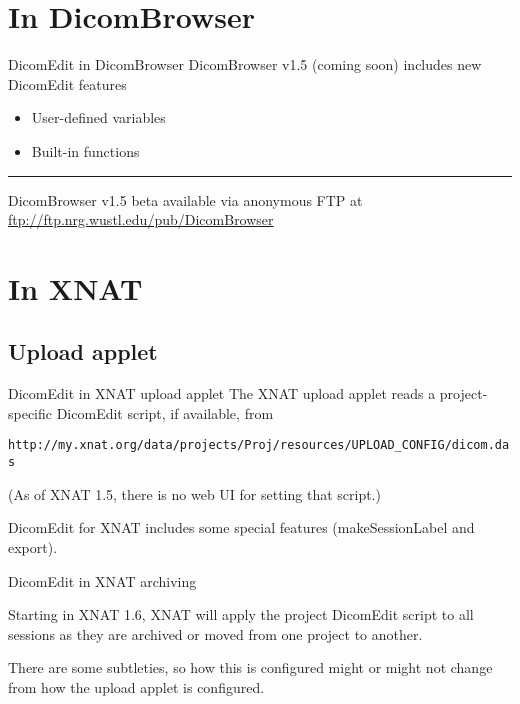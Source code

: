 \documentclass[handout]{beamer}
\begin{document}
\section{In DicomBrowser}
\begin{frame}{DicomEdit in DicomBrowser}
DicomBrowser v1.5 (coming soon) includes new DicomEdit features
\begin{itemize}
  \item User-defined variables
  \item Built-in functions
\end{itemize}
\vspace{5mm}
\hrule
\vspace{5mm}
DicomBrowser v1.5 beta available via anonymous FTP at
\url{ftp://ftp.nrg.wustl.edu/pub/DicomBrowser}
\end{frame}

\section{In XNAT}
\subsection{Upload applet}
\begin{frame}{DicomEdit in XNAT upload applet}
The XNAT upload applet reads a project-specific DicomEdit script,
if available, from

\vspace{5mm}
\scriptsize
\nolinkurl{http://my.xnat.org/data/projects/Proj/resources/UPLOAD_CONFIG/dicom.das}
\vspace{5mm}

\normalsize
(As of XNAT 1.5, there is no web UI for setting that script.)

DicomEdit for XNAT includes some special features (makeSessionLabel and export).
\end{frame}

\begin{frame}{DicomEdit in XNAT archiving}

Starting in XNAT 1.6, XNAT will apply the project DicomEdit script to
all sessions as they are archived or moved from one project to
another.

\pause
There are some subtleties, so how this is configured might or might
not change from how the upload applet is configured.
\end{frame}
\end{document}
